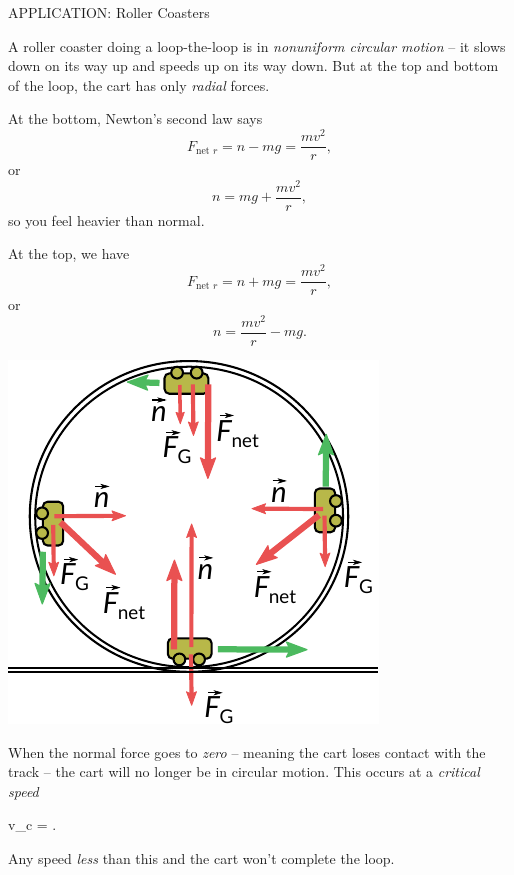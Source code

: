 \documentclass{summarysheet}
\begin{document}
\begin{multicols}{2}
\begin{topicbox}{APPLICATION: Roller Coasters}

\noindent A roller coaster doing a loop-the-loop is in \emph{nonuniform circular motion} -- it slows down on its way up and speeds up on its way down.  But at the top and bottom of the loop, the cart has only \emph{radial} forces.  

\begin{multicols}{2}

At the bottom, Newton's second law says
\[
F_\text{net $r$} = n - mg = \frac{mv^2}{r},
\]
or
\[
n = mg + \frac{mv^2}{r},
\]
so you feel heavier than normal.

At the top, we have 
\[
F_\text{net $r$} = n + mg = \frac{mv^2}{r},
\]
or
\[
n = \frac{mv^2}{r} - mg.
\]


\begin{center}
\includegraphics[scale=0.65]{fig_rc.pdf}
\end{center}
\end{multicols}

When the normal force goes to \emph{zero} -- meaning the cart loses contact with the track -- the cart will no longer be in circular motion.  This occurs at a \emph{critical speed}
\begin{eqbox}
v_c = .
\end{eqbox}
Any speed \emph{less} than this and the cart won't complete the loop.

\end{topicbox}


\end{multicols}



\end{document}
